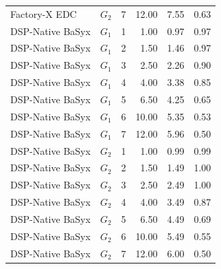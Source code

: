 \begin{tabular}{llrrrr}
    Factory-X EDC & $G_2$ & 7 & 12.00 & 7.55 & 0.63 \\
    DSP-Native BaSyx & $G_1$ & 1 & 1.00 & 0.97 & 0.97 \\
    DSP-Native BaSyx & $G_1$ & 2 & 1.50 & 1.46 & 0.97 \\
    DSP-Native BaSyx & $G_1$ & 3 & 2.50 & 2.26 & 0.90 \\
    DSP-Native BaSyx & $G_1$ & 4 & 4.00 & 3.38 & 0.85 \\
    DSP-Native BaSyx & $G_1$ & 5 & 6.50 & 4.25 & 0.65 \\
    DSP-Native BaSyx & $G_1$ & 6 & 10.00 & 5.35 & 0.53 \\
    DSP-Native BaSyx & $G_1$ & 7 & 12.00 & 5.96 & 0.50 \\
    DSP-Native BaSyx & $G_2$ & 1 & 1.00 & 0.99 & 0.99 \\
    DSP-Native BaSyx & $G_2$ & 2 & 1.50 & 1.49 & 1.00 \\
    DSP-Native BaSyx & $G_2$ & 3 & 2.50 & 2.49 & 1.00 \\
    DSP-Native BaSyx & $G_2$ & 4 & 4.00 & 3.49 & 0.87 \\
    DSP-Native BaSyx & $G_2$ & 5 & 6.50 & 4.49 & 0.69 \\
    DSP-Native BaSyx & $G_2$ & 6 & 10.00 & 5.49 & 0.55 \\
    DSP-Native BaSyx & $G_2$ & 7 & 12.00 & 6.00 & 0.50 \\
    \bottomrule
\end{tabular}
